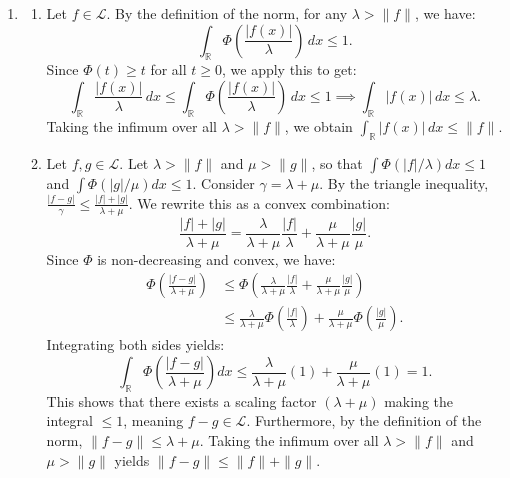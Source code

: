 \documentclass{article}
\begin{document}
\begin{enumerate}[label=\fbox{\arabic*}]
  \item %
        \begin{enumerate}[label=(\arabic*)]
          \item Let $f \in \mathcal{L}$. By the definition of the norm, for any $\lambda > \|f\|$, we have:
          \[
            \int_{\mathbb{R}} \Phi\left( \frac{|f(x)|}{\lambda} \right) \, dx \le 1.
          \]
          Since $\Phi(t) \ge t$ for all $t \ge 0$, we apply this to get:
          \[
            \int_{\mathbb{R}} \frac{|f(x)|}{\lambda} \, dx \le \int_{\mathbb{R}} \Phi\left( \frac{|f(x)|}{\lambda} \right) \, dx \le 1 \implies \int_{\mathbb{R}} |f(x)| \, dx \le \lambda.
          \]
          Taking the infimum over all $\lambda > \|f\|$, we obtain $\int_{\mathbb{R}} |f(x)| \, dx \le \|f\|$.

          \item Let $f, g \in \mathcal{L}$. Let $\lambda > \|f\|$ and $\mu > \|g\|$, so that $\int \Phi(|f|/\lambda) dx \le 1$ and $\int \Phi(|g|/\mu) dx \le 1$.
          Consider $\gamma = \lambda + \mu$. By the triangle inequality, $\frac{|f-g|}{\gamma} \le \frac{|f|+|g|}{\lambda+\mu}$.
          We rewrite this as a convex combination:
          \[
            \frac{|f|+|g|}{\lambda+\mu} = \frac{\lambda}{\lambda+\mu} \frac{|f|}{\lambda} + \frac{\mu}{\lambda+\mu} \frac{|g|}{\mu}.
          \]
          Since $\Phi$ is non-decreasing and convex, we have:
          \begin{align*}
            \Phi\left( \frac{|f-g|}{\lambda+\mu} \right) &\le \Phi\left( \frac{\lambda}{\lambda+\mu} \frac{|f|}{\lambda} + \frac{\mu}{\lambda+\mu} \frac{|g|}{\mu} \right) \\
            &\le \frac{\lambda}{\lambda+\mu} \Phi\left( \frac{|f|}{\lambda} \right) + \frac{\mu}{\lambda+\mu} \Phi\left( \frac{|g|}{\mu} \right).
          \end{align*}
          Integrating both sides yields:
          \[
            \int_{\mathbb{R}} \Phi\left( \frac{|f-g|}{\lambda+\mu} \right) dx \le \frac{\lambda}{\lambda+\mu}(1) + \frac{\mu}{\lambda+\mu}(1) = 1.
          \]
          This shows that there exists a scaling factor $(\lambda+\mu)$ making the integral $\le 1$, meaning $f-g \in \mathcal{L}$. Furthermore, by the definition of the norm, $\|f-g\| \le \lambda + \mu$.
          Taking the infimum over all $\lambda > \|f\|$ and $\mu > \|g\|$ yields $\|f-g\| \le \|f\| + \|g\|$.


\end{enumerate}
\end{enumerate}
\end{document}
